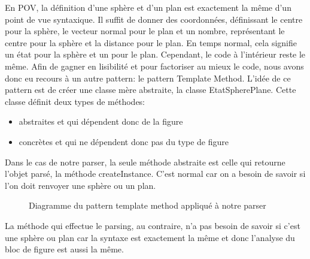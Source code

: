 \documentclass[../../Rapport RayTracer]{subfiles}
\begin{document}
En POV, la définition d'une sphère et d'un plan est exactement la même d'un point de vue syntaxique. Il suffit de donner des coordonnées, définissant le centre pour la sphère, le vecteur normal pour le plan et un nombre, représentant le centre pour la sphère et la distance pour le plan. En temps normal, cela signifie un état pour la sphère et un pour le plan. Cependant, le code à l'intérieur reste le même.
Afin de gagner en lisibilité et pour factoriser au mieux le code, nous avons donc eu recours à un autre pattern: le pattern Template Method. L'idée de ce pattern est de créer une classe mère abstraite, la classe EtatSpherePlane. Cette classe définit deux types de méthodes:

\begin{itemize}
\item abstraites et qui dépendent donc de la figure
\item concrètes et qui ne dépendent donc pas du type de figure
\end{itemize}

Dans le cas de notre parser, la seule méthode abstraite est celle qui retourne l'objet parsé, la méthode createInstance. C'est normal car on a besoin de savoir si l'on doit renvoyer une sphère ou un plan.

\begin{figure}[h!]
	
	\caption{Diagramme du pattern template method appliqué à notre parser}
	\label{diagrammePatternTemplateMethod}
\end{figure}
\FloatBarrier

La méthode qui effectue le parsing, au contraire,  n'a pas besoin de savoir si c'est une sphère ou plan car la syntaxe est exactement la même et donc l'analyse du bloc de figure est aussi la même.
\end{document}
